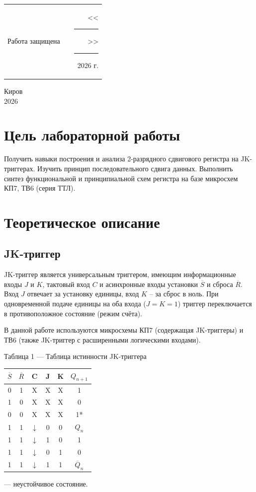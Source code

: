 \documentclass[oneside,a4paper,14pt]{extarticle}
\begin{document}
\noindent
\begin{tabular}{lp{58mm}r}
  Работа защищена &  & \hspace{5mm}<<\rule[-1mm]{5mm}{0.10mm}\/>>\rule[-1mm]{30mm}{0.10mm}\ 2026 г.
\end{tabular}
\vfill

\begin{center}
  Киров\\
  2026
\end{center}

\newpage\thispagestyle{plain}

\section{Цель лабораторной работы}
Получить навыки построения и анализа 2-разрядного сдвигового регистра на JK-триггерах. Изучить принцип последовательного сдвига данных. Выполнить синтез функциональной и принципиальной схем регистра на базе микросхем КП7, ТВ6 (серия ТТЛ).

\section{Теоретическое описание}
\subsection{JK-триггер}
JK-триггер является универсальным триггером, имеющим информационные входы $J$ и $K$, тактовый вход $C$ и асинхронные входы установки $\overline{S}$ и сброса $\overline{R}$. Вход $J$ отвечает за установку единицы, вход $K$ -- за сброс в ноль. При одновременной подаче единицы на оба входа ($J = K = 1$) триггер переключается в противоположное состояние (режим счёта).

В данной работе используются микросхемы КП7 (содержащая JK-триггеры) и ТВ6 (также JK-триггер с расширенными логическими входами).

\begin{center}
  Таблица 1 --- Таблица истинности JK-триггера \\
  \vspace{5mm}
  \begin{tabular}{|c|c|c|c|c|c|}
    \hline
    $\overline{S}$ & $\overline{R}$ & C & J & K & $Q_{n+1}$ \\
    \hline
    0 & 1 & X & X & X & 1 \\
    1 & 0 & X & X & X & 0 \\
    0 & 0 & X & X & X & 1* \\
    1 & 1 & $\downarrow$ & 0 & 0 & $Q_n$ \\
    1 & 1 & $\downarrow$ & 1 & 0 & 1 \\
    1 & 1 & $\downarrow$ & 0 & 1 & 0 \\
    1 & 1 & $\downarrow$ & 1 & 1 & $\overline{Q}_n$ \\
    \hline
  \end{tabular}
  \vspace{2mm}
  \par\footnotesize * --- неустойчивое состояние.
\end{center}
\end{document}
